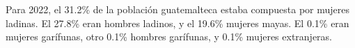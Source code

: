 Para 2022, el 31.2\% de la población guatemalteca estaba compuesta por mujeres ladinas. El 27.8\% eran hombres ladinos, y el 19.6\% mujeres mayas. El 0.1\% eran mujeres garífunas, otro 0.1\% hombres garífunas, y 0.1\% mujeres extranjeras.